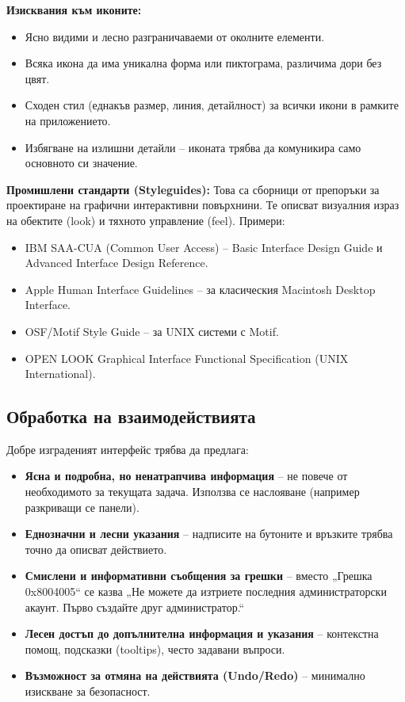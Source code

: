 \documentclass{scrartcl}
\begin{document}
\begin{FlushLeft}
\textbf{Изисквания към иконите:}
\begin{itemize}
    \item Ясно видими и лесно разграничаваеми от околните елементи.
    \item Всяка икона да има уникална форма или пиктограма, различима дори без цвят.
    \item Сходен стил (еднакъв размер, линия, детайлност) за всички икони в рамките на приложението.
    \item Избягване на излишни детайли – иконата трябва да комуникира само основното си значение.
\end{itemize}

\textbf{Промишлени стандарти (Styleguides):} Това са сборници от препоръки за проектиране на графични интерактивни повърхнини. Те описват визуалния израз на обектите (look) и тяхното управление (feel). Примери:
\begin{itemize}
    \item IBM SAA-CUA (Common User Access) – Basic Interface Design Guide и Advanced Interface Design Reference.
    \item Apple Human Interface Guidelines – за класическия Macintosh Desktop Interface.
    \item OSF/Motif Style Guide – за UNIX системи с Motif.
    \item OPEN LOOK Graphical Interface Functional Specification (UNIX International).
\end{itemize}

\subsection{Обработка на взаимодействията}

Добре изграденият интерфейс трябва да предлага:
\begin{itemize}
    \item \textbf{Ясна и подробна, но ненатрапчива информация} – не повече от необходимото за текущата задача. Използва се наслояване (например разкриващи се панели).
    \item \textbf{Еднозначни и лесни указания} – надписите на бутоните и връзките трябва точно да описват действието.
    \item \textbf{Смислени и информативни съобщения за грешки} – вместо „Грешка 0x8004005“ се казва „Не можете да изтриете последния администраторски акаунт. Първо създайте друг администратор.“
    \item \textbf{Лесен достъп до допълнителна информация и указания} – контекстна помощ, подсказки (tooltips), често задавани въпроси.
    \item \textbf{Възможност за отмяна на действията (Undo/Redo)} – минимално изискване за безопасност.
\end{itemize}


\end{FlushLeft}
\end{document}
